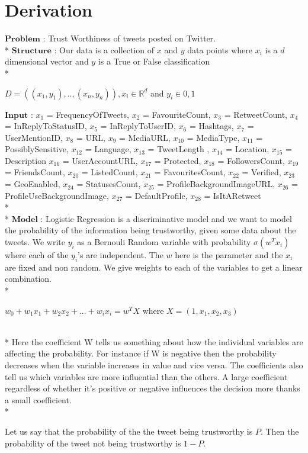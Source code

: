 \section{Derivation}
$\mathbf{Problem}$ : Trust Worthiness of tweets posted on Twitter.\\*
$\mathbf{Structure}$ : Our data is a collection of $x$ and $y$ data points where $x_i$ is a $d$ dimensional vector and $y$ is a True or False classification\\*
\centerline{$D = ((x_1,y_1),..,(x_n,y_n)) , x_i \in \mathbb{R}^d$  and  $y_i \in {0,1}$}
$\mathbf{Input}$ : $x_1$ = FrequencyOfTweets, $x_2$ = FavouriteCount, $x_3$ = RetweetCount, $x_4$ = InReplyToStatusID, $x_5$ = InReplyToUserID, $x_6$ = Hashtags, $x_7$ = UserMentionID, $x_8$ = URL, $x_9$ = MediaURL, $x_{10}$ = MediaType, $x_{11}$ = PossiblySensitive, $x_{12}$ = Language, $x_{13}$ = TweetLength , $x_{14}$ = Location, $x_{15}$ = Description $x_{16}$ = UserAccountURL, $x_{17}$ = Protected, $x_{18}$ = FollowersCount, $x_{19}$ = FriendsCount, $x_{20}$ = ListedCount, $x_{21}$ = FavouritesCount, $x_{22}$ = Verified, $x_{23}$ = GeoEnabled, $x_{24}$ = StatusesCount, $x_{25}$ = ProfileBackgroundImageURL, $x_{26}$ = ProfileUseBackgroundImage, $x_{27}$ = DefaultProfile, $x_{28}$ = IsItARetweet\\*\\*
$\mathbf{Model}$ :  Logistic Regression is a discriminative model and we want to model the probability of the information being trustworthy, given some data about the tweets. We write $y_i$ as a Bernouli Random variable with probability $\sigma(w^Tx_i)$ where each of the $y_i$'s are independent. The $w$ here is the parameter and the $x_i$ are fixed and non random. We give weights to each of the variables to get a linear combination. \\*
\centerline{$w_0 + w_1x_1 + w_2x_2 + ... + w_ix_i = w^TX$ where $X = (1,x_1,x_2,x_3)$} \\*
Here the coefficient W tells us something about how the individual variables are affecting the probability. For instance if W is negative then the probability decreases when the variable increases in value and vice versa. The coefficients also tell us which variables are more influential than the others. A large coefficient regardless of whether it's positive or negative influences the decision more thanks a small coefficient. \\*

Let us say that the probability of the the tweet being trustworthy is $P$. Then the probability of the tweet not being trustworthy is $1-P$.

